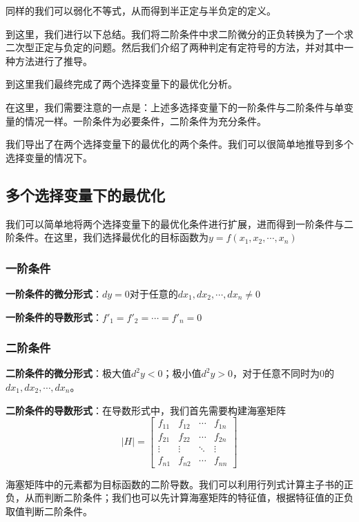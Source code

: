 \documentclass[UTF8,12pt]{ctexart}
\numberwithin{equation}{section} %
\numberwithin{figure}{section}
\numberwithin{table}{section}
\begin{document}
	同样的我们可以弱化不等式，从而得到半正定与半负定的定义。
	
	到这里，我们进行以下总结。我们将二阶条件中求二阶微分的正负转换为了一个求二次型正定与负定的问题。然后我们介绍了两种判定有定符号的方法，并对其中一种方法进行了推导。
	
	到这里我们最终完成了两个选择变量下的最优化分析。
	
	在这里，我们需要注意的一点是：上述多选择变量下的一阶条件与二阶条件与单变量的情况一样。一阶条件为必要条件，二阶条件为充分条件。
	
	我们导出了在两个选择变量下的最优化的两个条件。我们可以很简单地推导到多个选择变量的情况下。
	
	\subsection{多个选择变量下的最优化}
	
	我们可以简单地将两个选择变量下的最优化条件进行扩展，进而得到一阶条件与二阶条件。在这里，我们选择最优化的目标函数为$y = f(x_1,x_2,\cdots,x_n)$
	
	\subsubsection{一阶条件}
	\textbf{一阶条件的微分形式}：$dy = 0$对于任意的$dx_1,dx_2,\cdots,dx_n \neq 0$
	
	\textbf{一阶条件的导数形式}：$f'_1 = f'_2 = \cdots = f'_n = 0$
	
	\subsubsection{二阶条件}
	\textbf{二阶条件的微分形式}：极大值$d^2y < 0$；极小值$d^2y > 0$，对于任意不同时为0的$dx_1,dx_2,\cdots,dx_n$。
	
	\textbf{二阶条件的导数形式}：在导数形式中，我们首先需要构建海塞矩阵
	\begin{equation}
		|H| = 
		\begin{bmatrix}
			f_{11} & f_{12} &\cdots & f_{1n} \\
			f_{21} & f_{22} &\cdots & f_{2n} \\
			\vdots & \vdots &\ddots & \vdots \\
			f_{n1} & f_{n2} & \cdots&f_{nn}
		\end{bmatrix}
	\end{equation}
	
	海塞矩阵中的元素都为目标函数的二阶导数。我们可以利用行列式计算主子书的正负，从而判断二阶条件；我们也可以先计算海塞矩阵的特征值，根据特征值的正负取值判断二阶条件。
	
\end{document}
